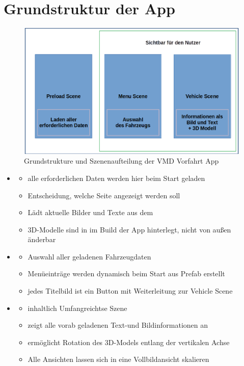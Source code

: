 \chapter{Grundstruktur der App}
\label{cha:basicstructure}
%
\begin{figure}[htp]
	\centering
	\includegraphics[width=.8\linewidth]{img/basic_structure}
	\caption[structure]{Grundstrukture und Szenenaufteilung der VMD Vorfahrt App}
	\label{fig:basicstructure}
\end{figure}

\begin{itemize}
	\item \pres
	\begin{itemize}
		\item alle erforderlichen Daten werden hier beim Start geladen
		\item Entscheidung, welche Seite angezeigt werden soll
		\item Lädt aktuelle Bilder und Texte aus dem \sad
		\item 3D-Modelle sind in im Build der App hinterlegt, nicht von außen änderbar
	\end{itemize}
	\item \mms
	\begin{itemize}
		\item Auswahl aller geladenen Fahrzeugdaten
		\item Menüeinträge werden dynamisch beim Start aus Prefab erstellt
		\item jedes Titelbild ist ein Button mit Weiterleitung zur Vehicle Scene
	\end{itemize}
	\item \vhs
	\begin{itemize}
		\item inhaltlich Umfangreichtse Szene
		\item zeigt alle vorab geladenen Text-und Bildinformationen an
		\item ermöglicht Rotation des 3D-Models entlang der vertikalen Achse
		\item Alle Ansichten lassen sich in eine Vollbildansicht skalieren
	\end{itemize}
\end{itemize}
%